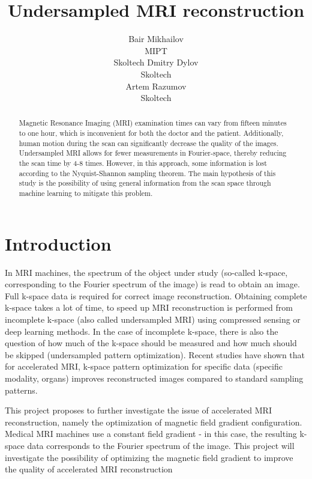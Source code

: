\documentclass{article}
\title{Undersampled MRI reconstruction}
\author{Bair Mikhailov \\
        MIPT \\
        Skoltech
	\And
	  Dmitry Dylov \\
	Skoltech\\
 \And
	  Artem Razumov \\
	Skoltech\\
}
\date{}
\begin{document}
\maketitle

\begin{abstract}
    Magnetic Resonance Imaging (MRI) examination times can vary from fifteen minutes to one hour, which is inconvenient for both the doctor and the patient. Additionally, human motion during the scan can significantly decrease the quality of the images. Undersampled MRI allows for fewer measurements in Fourier-space, thereby reducing the scan time by 4-8 times. However, in this approach, some information is lost according to the Nyquist-Shannon sampling theorem. The main hypothesis of this study is the possibility of using general information from the scan space through machine learning to mitigate this problem. 
\end{abstract}



\section{Introduction}
In MRI machines, the spectrum of the object under study (so-called k-space, corresponding to the Fourier spectrum of the image) is read to obtain an image. Full k-space data is required for correct image reconstruction. Obtaining complete k-space takes a lot of time, to speed up MRI reconstruction is performed from incomplete k-space (also called undersampled MRI) using compressed sensing or deep learning methods. In the case of incomplete k-space, there is also the question of how much of the k-space should be measured and how much should be skipped (undersampled pattern optimization). Recent studies  have shown that for accelerated MRI, k-space pattern optimization for specific data (specific modality, organs) improves reconstructed images compared to standard sampling patterns.
 
 This project proposes to further investigate the issue of accelerated MRI reconstruction, namely the optimization of magnetic field gradient configuration. Medical MRI machines use a constant field gradient - in this case, the resulting k-space data corresponds to the Fourier spectrum of the image. This project will investigate the possibility of optimizing the magnetic field gradient to improve the quality of accelerated MRI reconstruction
\end{document}
